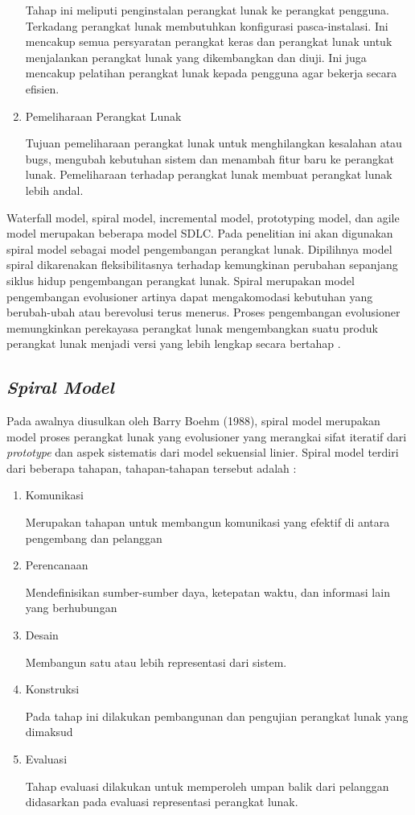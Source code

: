 \begin{enumerate}
	Tahap ini meliputi penginstalan perangkat lunak ke perangkat pengguna. Terkadang perangkat lunak membutuhkan konfigurasi pasca-instalasi. Ini mencakup semua persyaratan perangkat keras dan perangkat lunak untuk menjalankan perangkat lunak yang dikembangkan dan diuji. Ini juga mencakup pelatihan perangkat lunak kepada pengguna agar bekerja secara efisien.
	\item Pemeliharaan Perangkat Lunak
	
	Tujuan pemeliharaan perangkat lunak untuk menghilangkan kesalahan atau bugs, mengubah kebutuhan sistem dan menambah fitur baru ke perangkat lunak. Pemeliharaan terhadap perangkat lunak membuat perangkat lunak lebih andal.
\end{enumerate}
  
Waterfall model, spiral model, incremental model, prototyping model, dan agile model merupakan beberapa model SDLC. Pada penelitian ini akan digunakan spiral model sebagai model pengembangan perangkat lunak. Dipilihnya model spiral dikarenakan fleksibilitasnya terhadap kemungkinan perubahan sepanjang siklus hidup pengembangan perangkat lunak. Spiral merupakan model pengembangan evolusioner artinya dapat mengakomodasi kebutuhan yang berubah-ubah atau berevolusi terus menerus. Proses pengembangan evolusioner memungkinkan perekayasa perangkat lunak mengembangkan suatu produk perangkat lunak menjadi versi yang lebih lengkap secara bertahap \cite{Made}. 


\subsection{\emph{Spiral Model}} 

Pada awalnya diusulkan oleh Barry Boehm (1988), spiral model merupakan model proses perangkat lunak yang evolusioner yang merangkai sifat iteratif dari \textit{prototype} dan aspek sistematis dari model sekuensial linier. Spiral model terdiri dari beberapa tahapan, tahapan-tahapan tersebut adalah \cite{Pressman}:

\begin{enumerate}
	\item Komunikasi

	Merupakan tahapan untuk membangun komunikasi yang efektif di antara pengembang dan pelanggan
	\item Perencanaan
	
	Mendefinisikan sumber-sumber daya, ketepatan waktu, dan informasi lain yang berhubungan
	\item Desain
	
	Membangun satu atau lebih representasi dari sistem. 
	\item Konstruksi 
	
	Pada tahap ini dilakukan pembangunan dan pengujian perangkat lunak yang dimaksud
	\item Evaluasi
	
	Tahap evaluasi dilakukan untuk memperoleh umpan balik dari pelanggan didasarkan pada evaluasi representasi perangkat lunak.
\end{enumerate}

